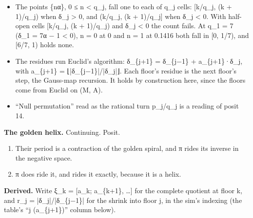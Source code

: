 \begin{itemize}
\begin{itemize}
\item The points \{nα\}, 0 ≤ n < q\_\allowbreak{}j, fall one to each of q\_\allowbreak{}j cells: [k/q\_\allowbreak{}j, (k + 1)/q\_\allowbreak{}j) when δ\_\allowbreak{}j > 0, and (k/q\_\allowbreak{}j, (k + 1)/q\_\allowbreak{}j] when δ\_\allowbreak{}j < 0. With half-open cells [k/q\_\allowbreak{}j, (k + 1)/q\_\allowbreak{}j) and δ\_\allowbreak{}j < 0 the count fails. At q\_\allowbreak{}1 = 7 (δ\_\allowbreak{}1 = 7α − 1 < 0), n = 0 at 0 and n = 1 at 0.1416 both fall in [0, 1/7), and [6/7, 1) holds none.
\item The residues run Euclid's algorithm: δ\_\allowbreak{}\{j+1\} = δ\_\allowbreak{}\{j−1\} + a\_\allowbreak{}\{j+1\}·δ\_\allowbreak{}j, with a\_\allowbreak{}\{j+1\} = ⌊|δ\_\allowbreak{}\{j−1\}|/|δ\_\allowbreak{}j|⌋. Each floor's residue is the next floor's step, the Gauss-map recursion. It holds by construction here, since the floors come from Euclid on (M, A).
\item “Null permutation” read as the rational turn p\_\allowbreak{}j/q\_\allowbreak{}j is a reading of posit 14.
\end{itemize}
\end{itemize}

\textbf{The golden helix.} Continuing. Posit.

\begin{enumerate}
\item Their period is a contraction of the golden spiral, and π rides its inverse in the negative space.
\item π does ride it, and rides it exactly, because it is a helix.
\end{enumerate}

\textbf{Derived.} Write ξ\_\allowbreak{}k = [a\_\allowbreak{}k; a\_\allowbreak{}\{k+1\}, …] for the complete quotient at floor k, and r\_\allowbreak{}j = |δ\_\allowbreak{}j|/|δ\_\allowbreak{}\{j−1\}| for the shrink into floor j, in the sim's indexing (the table's “j (a\_\allowbreak{}\{j+1\})” column below).

